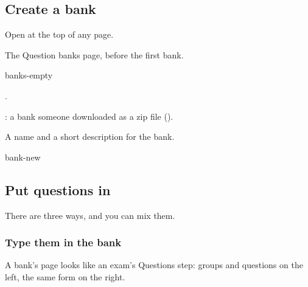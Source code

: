 \documentclass[11pt]{article}
\begin{document}
\subsection{Create a bank}

Open  at the top of any page.

\begin{keep}
\begin{guidefig}{The Question banks page, before the first bank.}
\begin{shot}[0.9\linewidth]{banks-empty}
\end{shot}
\end{guidefig}
\begin{callouts}
  \item {}.
  \item {}: a bank someone downloaded as a zip file ().
\end{callouts}
\end{keep}

\begin{guidefig}{A name and a short description for the bank.}
\begin{shot}[0.52\linewidth]{bank-new}
\end{shot}
\end{guidefig}

\subsection{Put questions in}

There are three ways, and you can mix them.

\subsubsection{Type them in the bank}

A bank's page looks like an exam's Questions step: groups and questions on the left, the same form on the right.
\end{document}
